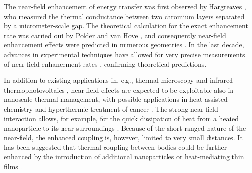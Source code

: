 
The near-field enhancement of energy transfer was first observed by Hargreaves \cite{hargreaves69}, who measured the thermal conductance between two chromium layers separated by a micrometer-scale gap. The theoretical calculation for the exact enhancement rate was carried out by Polder and van Hove \cite{polder71}, and consequently near-field enhancement effects were predicted in numerous geometries \cite{loomis94,pendry99,carminati99,shchegrov00,mulet01,volokitin01}. In the last decade, advances in experimental techniques have allowed for very precise measurements of near-field enhancement rates \cite{kittel05,hu08,shen09,ottens11}, confirming theoretical predictions. 

In addition to existing applications in, e.g., thermal microscopy \cite{majumdar99,muller-hirsch99,kittel05,kittel08} and infrared thermophotovoltaics \cite{dimatteo01,narayanaswamy03,laroche06}, near-field effects are expected to be exploitable also in nanoscale thermal management, with possible applications in heat-assisted chemistry \cite{cao07,adleman09} and hyperthermic treatment of cancer \cite{vanderzee02}. The strong near-field interaction allows, for example, for the quick dissipation of heat from a heated nanoparticle to its near surroundings \cite{mulet01,domingues05}. Because of the short-ranged nature of the near-field, the enhanced coupling is, however, limited to very small distances. It has been suggested that thermal coupling between bodies could be further enhanced by the introduction of additional nanoparticles  \cite{benabdallah11,messina13} or heat-mediating thin films \cite{zheng11,messina12}. 

